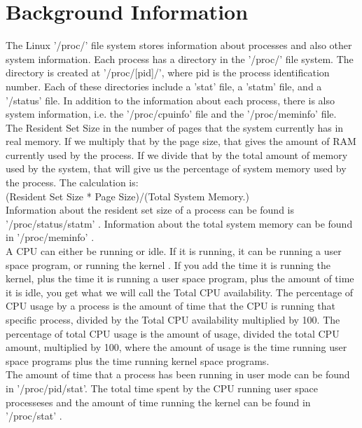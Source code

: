 \documentclass[12pt]{article}
\begin{document}
	\section{Background Information}
	The Linux '/proc/' file system stores information about processes and also other system information. Each process has a directory in the '/proc/' file system\cite[p. 792]{text}. The directory is created at '/proc/[pid]/', where pid is the process identification number. Each of these directories include a 'stat' file, a 'statm' file, and a '/status' file. In addition to the information about each process, there is also system information, i.e. the '/proc/cpuinfo' file and the '/proc/meminfo' file.\\
	The Resident Set Size in the number of pages that the system currently has in real memory.
	If we multiply that by the page size, that gives the amount of RAM currently used by the process.
	If we divide that by the total amount of memory used by the system, that will give us the percentage of system memory used by the process.
	The calculation is:\\
	(Resident Set Size * Page Size)/(Total System Memory.)\\
	Information about the resident set size of a process can be found is '/proc/status/statm' \cite{manProc}.
	Information about the total system memory can be found in '/proc/meminfo' \cite{manProc}.\\

A CPU can either be running or idle.
If it is running, it can be running a user space program, or running the kernel \cite{scoutBlog}.
If you add the time it is running the kernel, plus the time it is running a user space program, plus the amount of time it is idle, you get what we will call the Total CPU availability.
The percentage of CPU usage by a process is the amount of time that the CPU is running that specific process, divided by the Total CPU availability multiplied by 100.
The percentage of total CPU usage is the amount of usage, divided the total CPU amount, multiplied by 100, where the amount of usage is the time running user space programs plus the time running kernel space programs.\\
The amount of time that a process has been running in user mode can be found in '/proc/pid/stat'. \cite{manProc}
The total time spent by the CPU running user space processeses and the amount of time running the kernel can be found in '/proc/stat' \cite{manProc}.\\
	
\end{document}
